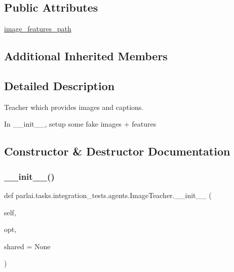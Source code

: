\subsection*{Public Attributes}
\begin{DoxyCompactItemize}
\item 
\hyperlink{classparlai_1_1tasks_1_1integration__tests_1_1agents_1_1ImageTeacher_a252433e0d09c09207362b031aa295696}{image\+\_\+features\+\_\+path}
\end{DoxyCompactItemize}
\subsection*{Additional Inherited Members}


\subsection{Detailed Description}
\begin{DoxyVerb}Teacher which provides images and captions.

In __init__, setup some fake images + features
\end{DoxyVerb}
 

\subsection{Constructor \& Destructor Documentation}
\mbox{\label{classparlai_1_1tasks_1_1integration__tests_1_1agents_1_1ImageTeacher_a3341d0d235586140b1c0c231a21182ff}} 
\subsubsection{\texorpdfstring{\+\_\+\+\_\+init\+\_\+\+\_\+()}{\_\_init\_\_()}}
{\footnotesize\ttfamily def parlai.\+tasks.\+integration\+\_\+tests.\+agents.\+Image\+Teacher.\+\_\+\+\_\+init\+\_\+\+\_\+ (\begin{DoxyParamCaption}\item[{}]{self,  }\item[{}]{opt,  }\item[{}]{shared = {\ttfamily None} }\end{DoxyParamCaption})}



